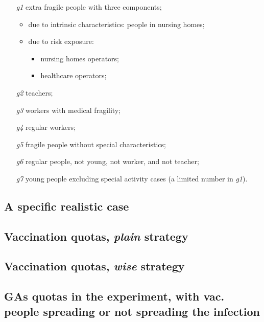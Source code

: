 \documentclass[graybox]{svmult}
\begin{document}
\begin{enumerate}
\item [\emph{g1}]
	extra fragile people with three components;
	\begin{itemize}
		\item due to intrinsic characteristics: people in nursing homes;
		\item due to risk exposure:
		\begin{itemize}
			\item nursing homes operators;
			\item healthcare operators;
 		\end{itemize} 
 	\end{itemize}  
\item [\emph{g2}]
	teachers;
\item [\emph{g3}]
	workers with medical fragility;
\item [\emph{g4}]
	regular workers;
\item [\emph{g5}]
	fragile people without special characteristics;
\item [\emph{g6}]
	regular people, not young, not worker, and not teacher;
\item [\emph{g7}]
	young people excluding special activity cases (a limited number in \emph{g1}).
\end{enumerate}


\subsection{A specific realistic case}

\subsection{Vaccination quotas, \emph{plain} strategy}


\subsection{Vaccination quotas, \emph{wise} strategy}



\subsection{GAs quotas in the experiment, with vac. people spreading or not spreading the infection}
\end{document}
